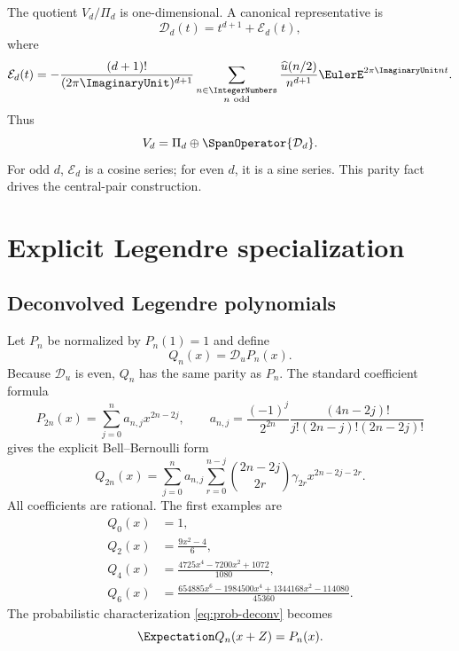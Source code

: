 \documentclass[11pt,oneside]{article}
\numberwithin{equation}{section}
\theoremstyle{definition}
\theoremstyle{remark}
\newcommand{\Dscr}{\mathscr D_u}
\begin{document}
The quotient $V_d/\Pi_d$ is one-dimensional.  A canonical representative is
\begin{equation}
 \mathcal D_d(t)=t^{d+1}+\mathcal E_d(t),
 \label{eq:defect}
\end{equation}
where
\begin{equation}
 \mathcal E_d(t)=-\frac{(d+1)!}{(2\pi\ImaginaryUnit)^{d+1}}
 \sum_{\substack{n\in\IntegerNumbers\\ n\ \mathrm{odd}}}
 \frac{\widehat u(n/2)}{n^{d+1}}\EulerE^{2\pi\ImaginaryUnit nt}.
 \label{eq:defect-series}
\end{equation}
Thus
\begin{equation}
 V_d=\Pi_d\oplus\SpanOperator\{\mathcal D_d\}.
 \label{eq:defect-split}
\end{equation}
For odd $d$, $\mathcal E_d$ is a cosine series; for even $d$, it is a sine
series.  This parity fact drives the central-pair construction.

\section{Explicit Legendre specialization}
\label{sec:legendre-specialization}

\subsection{Deconvolved Legendre polynomials}

Let $P_n$ be normalized by $P_n(1)=1$ and define
\begin{equation}
 Q_n(x)=\Dscr P_n(x).
 \label{eq:Qn-def}
\end{equation}
Because $\Dscr$ is even, $Q_n$ has the same parity as $P_n$.  The standard
coefficient formula
\begin{equation}
 P_{2n}(x)=\sum_{j=0}^{n}a_{n,j}x^{2n-2j},\qquad
 a_{n,j}=\frac{(-1)^j}{2^{2n}}
 \frac{(4n-2j)!}{j!(2n-j)!(2n-2j)!}
 \label{eq:P-even-coeff}
\end{equation}
gives the explicit Bell--Bernoulli form
\begin{equation}
 \boxed{
 Q_{2n}(x)=\sum_{j=0}^{n}a_{n,j}
 \sum_{r=0}^{n-j}\binom{2n-2j}{2r}\gamma_{2r}
 x^{2n-2j-2r}.}
 \label{eq:Q-even-explicit}
\end{equation}
All coefficients are rational.  The first examples are
\begin{align}
 Q_0(x)&=1,\nonumber\\
 Q_2(x)&=\frac{9x^2-4}{6},\label{eq:Q2}\\
 Q_4(x)&=\frac{4725x^4-7200x^2+1072}{1080},\nonumber\\
 Q_6(x)&=\frac{654885x^6-1984500x^4+1344168x^2-114080}{45360}.
 \label{eq:Qexamples}
\end{align}
The probabilistic characterization \eqref{eq:prob-deconv} becomes
\begin{equation}
 \Expectation Q_n(x+Z)=P_n(x).
 \label{eq:Q-probability}
\end{equation}
\end{document}
